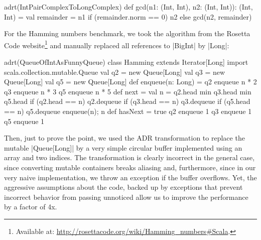 \begin{lstlisting-nobreak}
adrt(IntPairComplexToLongComplex) {
  def gcd(n1: (Int, Int), n2: (Int, Int)): (Int, Int) = {
    val remainder = n1 %
    if (remainder.norm == 0) n2 else gcd(n2, remainder)
  }
}
\end{lstlisting-nobreak}

For the Hamming numbers benchmark, we took the algorithm from the Rosetta Code website\footnote{Available at: \url{http://rosettacode.org/wiki/Hamming_numbers#Scala}.} and manually replaced all references to |BigInt| by |Long|:

\begin{lstlisting-nobreak}
adrt(QueueOfIntAsFunnyQueue) {
  class Hamming extends Iterator[Long] {
    import scala.collection.mutable.Queue
    val q2 = new Queue[Long]
    val q3 = new Queue[Long]
    val q5 = new Queue[Long]
    def enqueue(n: Long) = {
      q2 enqueue n * 2
      q3 enqueue n * 3
      q5 enqueue n * 5
    }
    def next = {
      val n = q2.head min q3.head min q5.head
      if (q2.head == n) q2.dequeue
      if (q3.head == n) q3.dequeue
      if (q5.head == n) q5.dequeue
      enqueue(n); n
    }
    def hasNext = true
    q2 enqueue 1
    q3 enqueue 1
    q5 enqueue 1
  }
}
\end{lstlisting-nobreak}

Then, just to prove the point, we used the ADR transformation to replace the mutable |Queue[Long]| by a very simple circular buffer implemented using an array and two indices. The transformation is clearly incorrect in the general case, since converting mutable containers breaks aliasing and, furthermore, since in our very naive implementation, we throw an exception if the buffer overflows. Yet, the aggressive assumptions about the code, backed up by exceptions that prevent incorrect behavior from passing unnoticed allow us to improve the performance by a factor of 4x.


